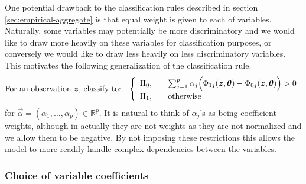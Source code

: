 One potential drawback to the classification rules described in section
\ref{sec:empirical-aggregate} is that equal weight is given to each of
variables.  Naturally, some variables may potentially be more discriminatory and
we would like to draw more heavily on these variables for classification
purposes, or conversely we would like to draw less heavily on less
discriminatory variables.  This motivates the following generalization of the
classification rule.  
\begin{equation}
  \label{eq:varying-coefficient-classifier}
  \text{For an observation $\vec{z}$, classify to:} \hspace{3mm}
  \left\{
    \begin{array}{lll}
      \Pi_0, & & \sum_{j=1}^p \alpha_j \Big( \Phi_{1j}(\vec{z}, \vec{\theta}) -
                 \Phi_{0j}(\vec{z}, \vec{\theta}) \Big) > 0 \\[1ex]
      \Pi_1, & & \text{otherwise}
    \end{array}
  \right.
\end{equation}
for $\vec{\alpha} = (\alpha_1, \dots, \alpha_p) \in \mathbb{R}^p$. It is natural
to think of $\alpha_j$'s as being coefficient weights, although in actually they
are not weights as they are not normalized and we allow them to be negative.  By
not imposing these restrictions this allows the model to more readily handle
complex dependencies between the variables.


\subsubsection{Choice of variable coefficients}
\label{sec: var coefs}

